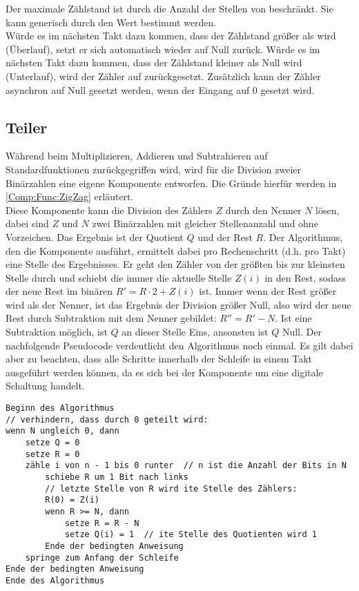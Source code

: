 Der maximale Zählstand ist durch die Anzahl der Stellen von  beschränkt. Sie kann generisch durch den Wert  bestimmt werden. \\
Würde es im nächsten Takt dazu kommen, dass der Zählstand größer als  wird (Überlauf), setzt er sich automatisch wieder auf Null zurück.
Würde es im nächsten Takt dazu kommen, dass der Zählstand kleiner als Null wird (Unterlauf), wird der Zähler auf  zurückgesetzt.
Zusätzlich kann der Zähler asynchron auf Null gesetzt werden, wenn der Eingang  auf 0 gesetzt wird.


\subsection{Teiler} \label{Comp:Arith:Division}
Während beim Multiplizieren, Addieren und Subtrahieren auf Standardfunktionen
zurückgegriffen wird, wird für die Division zweier Binärzahlen eine eigene
Komponente entworfen. Die Gründe hierfür werden in \cref{Comp:Func:ZigZag}
erläutert. \\ %
Diese Komponente kann die Division des Zählers $Z$ durch den Nenner $N$
lösen, dabei sind $Z$ und $N$ zwei Binärzahlen mit gleicher
Stellenanzahl und ohne Vorzeichen. Das Ergebnis ist der Quotient $Q$ und der Rest $R$. Der Algorithmus, den die Komponente ausführt, ermittelt dabei pro Rechenschritt (d.h. pro Takt) eine Stelle des Ergebnisses.
Er geht den Zähler von der größten bis zur kleinsten Stelle durch und schiebt die immer die aktuelle Stelle $Z(i)$ in den Rest, sodass der neue Rest im binären $R' = R \cdot 2 + Z(i)$ ist.
Immer wenn der Rest größer wird als der Nenner, ist das Ergebnis der Division größer Null, also wird der neue Rest durch Subtraktion mit dem Nenner gebildet: $R'' = R' - N$.
Ist eine Subtraktion möglich, ist $Q$ an dieser Stelle Eins, ansonsten ist $Q$ Null. Der nachfolgende Pseudocode verdeutlicht den Algorithmus noch einmal.
Es gilt dabei aber zu beachten, dass alle Schritte innerhalb der Schleife in einem Takt ausgeführt werden können, da es sich bei der Komponente um eine digitale Schaltung handelt.

\begin{verbatim}
Beginn des Algorithmus
// verhindern, dass durch 0 geteilt wird:
wenn N ungleich 0, dann
    setze Q = 0
    setze R = 0
    zähle i von n - 1 bis 0 runter  // n ist die Anzahl der Bits in N
        schiebe R um 1 Bit nach links
        // letzte Stelle von R wird ite Stelle des Zählers:
        R(0) = Z(i)                    
        wenn R >= N, dann               
            setze R = R - N
            setze Q(i) = 1  // ite Stelle des Quotienten wird 1 
        Ende der bedingten Anweisung
    springe zum Anfang der Schleife
Ende der bedingten Anweisung
Ende des Algorithmus
\end{verbatim}

